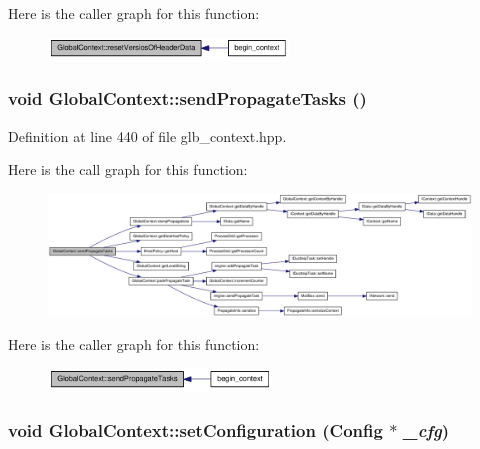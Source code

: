 Here is the caller graph for this function:\nopagebreak
\begin{figure}[H]
\begin{center}
\leavevmode
\includegraphics[width=181pt]{class_global_context_aa903129142d1e7420aa521b89e77789b_icgraph}
\end{center}
\end{figure}
\hypertarget{class_global_context_ab7a7663698431c03044fb91223a8b0df}{
\subsubsection[{sendPropagateTasks}]{\setlength{\rightskip}{0pt plus 5cm}void GlobalContext::sendPropagateTasks ()}}
\label{class_global_context_ab7a7663698431c03044fb91223a8b0df}


Definition at line 440 of file glb\_\-context.hpp.

Here is the call graph for this function:\nopagebreak
\begin{figure}[H]
\begin{center}
\leavevmode
\includegraphics[width=420pt]{class_global_context_ab7a7663698431c03044fb91223a8b0df_cgraph}
\end{center}
\end{figure}


Here is the caller graph for this function:\nopagebreak
\begin{figure}[H]
\begin{center}
\leavevmode
\includegraphics[width=168pt]{class_global_context_ab7a7663698431c03044fb91223a8b0df_icgraph}
\end{center}
\end{figure}
\hypertarget{class_global_context_a7bf92109c22a9c883b6ca92143098019}{
\subsubsection[{setConfiguration}]{\setlength{\rightskip}{0pt plus 5cm}void GlobalContext::setConfiguration ({\bf Config} $\ast$ {\em \_\-cfg})}}
\label{class_global_context_a7bf92109c22a9c883b6ca92143098019}


